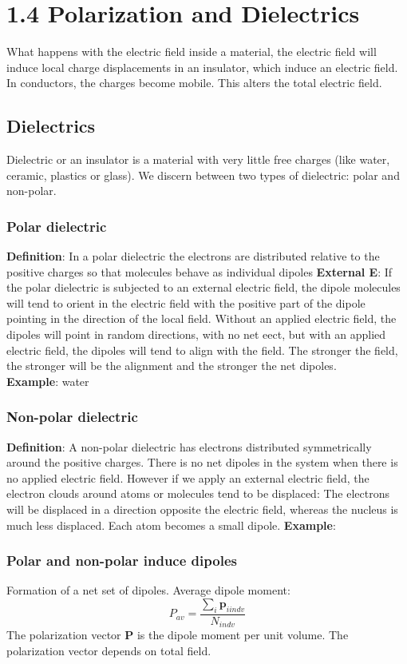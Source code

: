 \documentclass[
12pt, reprint, aip, onecolumn, notitlepage
]{revtex4-1}
\begin{document}
\section{1.4 Polarization and Dielectrics}
What happens with the electric field inside a material, the electric field will induce local charge displacements in an insulator, which induce an electric field. In conductors, the charges become mobile. This alters the total electric field. 
\subsection{Dielectrics}
Dielectric or an insulator is a material with very little free charges (like water, ceramic, plastics or glass). We discern between two types of dielectric: polar and non-polar.
\subsubsection*{Polar dielectric}
\textbf{Definition}: In a polar dielectric the electrons are distributed relative to the positive charges so that molecules behave as individual dipoles
\textbf{External E}: If the polar dielectric is subjected to an external electric field, the dipole molecules will tend to orient in the electric field with the positive part of the dipole
pointing in the direction of the local field. Without an applied electric
field, the dipoles will point in random directions, with no net eect, but
with an applied electric field, the dipoles will tend to align with the
field. The stronger the field, the stronger will be the alignment and the
stronger the net dipoles.\\
\textbf{Example}: water

\subsubsection*{Non-polar dielectric}
\textbf{Definition}: A non-polar dielectric has electrons distributed symmetrically around the positive charges. There is no net dipoles in the system when there is no applied electric field. However if we apply an external electric field, the electron clouds around atoms
or molecules tend to be displaced: The electrons will be displaced in a
direction opposite the electric field, whereas the nucleus is much less displaced. Each atom becomes a small dipole. 
\textbf{Example}:

\subsubsection{Polar and non-polar induce dipoles}
Formation of a net set of dipoles. Average dipole moment:
\begin{equation}
	P_{av} = \dfrac{\sum_i \mathbf{p}_{i in dv}}{N_{in dv}}
\end{equation}
The polarization vector $\mathbf{P}$ is the dipole moment per unit volume. 
The polarization vector depends on total field. \\
\end{document}
